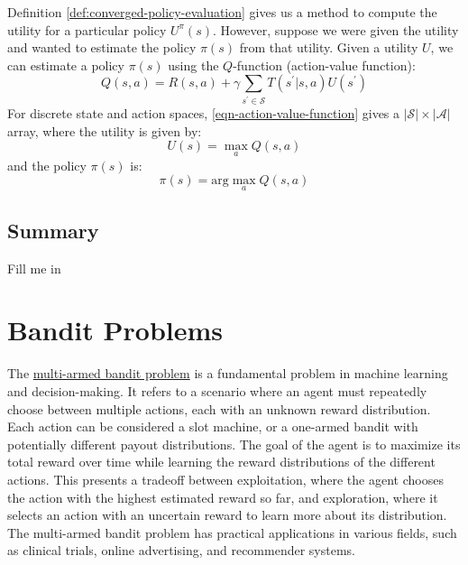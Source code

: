 \documentclass[11pt]{article}
\theoremstyle{definition}
\begin{document}
Definition \ref{def:converged-policy-evaluation} gives us a method to compute the utility for a particular policy $U^{\pi}(s)$. 
However, suppose we were given the utility and wanted to estimate the policy $\pi(s)$ from that utility. 
Given a utility $U$, we can estimate a policy $\pi(s)$ using the $Q$-function (action-value function):
\begin{equation}\label{eqn-action-value-function}
Q(s,a) = R(s,a) + \gamma\sum_{s^{\prime}\in\mathcal{S}}T(s^{\prime} | s, a)U(s^{\prime})
\end{equation}
For discrete state and action spaces, \eqref{eqn-action-value-function} gives a $|\mathcal{S}|\times|\mathcal{A}|$ array, where the utility is given by:
\begin{equation}\label{eqn-utility-from-Q}
U(s) = \max_{a} Q(s,a)
\end{equation}
and the policy $\pi(s)$ is:
\begin{equation}\label{eqn-policy-from-Q}
\pi(s) = \text{arg}\max_{a}Q(s,a)
\end{equation}

\subsection{Summary}
Fill me in

\section{Bandit Problems}\label{sec:bandit-problems}
The \href{https://en.wikipedia.org/wiki/Multi-armed_bandit}{multi-armed bandit problem} is a fundamental problem in machine learning and decision-making. 
It refers to a scenario where an agent must repeatedly choose between multiple actions, each with an unknown reward distribution. 
Each action can be considered a slot machine, or a one-armed bandit with potentially different payout distributions. 
The goal of the agent is to maximize its total reward over time while learning the reward distributions of the different actions. 
This presents a tradeoff between exploitation, where the agent chooses the action with the highest estimated reward so far, and exploration, 
where it selects an action with an uncertain reward to learn more about its distribution. The multi-armed bandit problem has practical applications in various fields, 
such as clinical trials, online advertising, and recommender systems.
\end{document}
